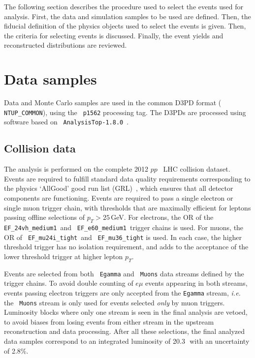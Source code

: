 The following section describes the procedure used to select the events used for analysis. First, the data and simulation samples to be used are defined. Then, the fiducial definition of the physics objects used to select the events is given. Then, the criteria for selecting events is discussed. Finally, the event yields and reconstructed distributions are reviewed. 

\section{Data samples}
Data and Monte Carlo samples are used in the common D3PD format (\texttt{ NTUP\_COMMON}), using the \texttt{ p1562} processing tag. The D3PDs are processed using software based on \texttt{ AnalysisTop-1.8.0}~\cite{trc}.

\subsection{Collision data}
The analysis is performed on the complete 2012 $pp$   \tev\ LHC collision dataset. Events are required to
fulfill standard data quality requirements corresponding to the physics  `AllGood' good run list (GRL)~\cite{grl}, which ensures that all detector components are functioning. Events are required to pass a single electron or single muon trigger chain, with thresholds that are maximally efficient for leptons passing offline selections of $p_T>25$\,GeV.  For electrons, the OR of the \texttt{ EF\_24vh\_medium1}\ and \texttt{ EF\_e60\_medium1}\ trigger chains is used. For muons, the OR of \texttt{ EF\_mu24i\_tight}\ and \texttt{ EF\_mu36\_tight} is used. In each case, the higher threshold trigger has no isolation requirement, and adds to the acceptance of the lower threshold trigger at higher lepton $p_T$. 

Events are selected from both \texttt{ Egamma} and \texttt{ Muons} data streams defined by the trigger chains. To avoid double counting of $e\mu$ events appearing in both streams, events passing electron triggers are only accepted from the \texttt{Egamma} stream, {\em i.e.} the \texttt{ Muons} stream is only used for events selected \emph{only} by muon triggers. Luminosity blocks where only one stream is seen in the final analysis are vetoed, to avoid biases from losing events from either stream in the upstream reconstruction and data processing. 
After all these selections, the final analyzed data samples correspond to an integrated luminosity of 20.3\,\ifb\ with an uncertainty of 2.8\%.

